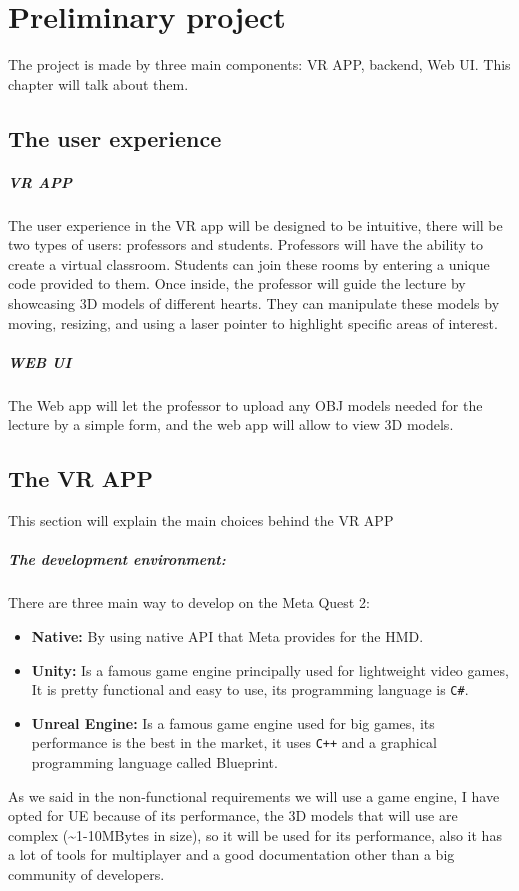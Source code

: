 
\chapter{Preliminary project}
\noindent
The project is made by three main components: \ac{VR} APP, backend, Web \ac{UI}. This chapter will talk about them.
\section{The user experience}
\paragraph{VR APP}
The user experience in the \ac{VR} app will be designed to be intuitive, there will be two types of users: professors and students.
Professors will have the ability to create a virtual classroom. Students can join these rooms by entering a unique code provided to them. Once inside, the professor will guide the lecture by showcasing 3D models of different hearts.
They can manipulate these models by moving, resizing, and using a laser pointer to highlight specific areas of interest. 
\paragraph{WEB UI}
The Web app will let the professor to upload any OBJ models needed for the lecture by a simple form, and the web app will allow to view 3D models.

\section{The VR APP}
\noindent
This section will explain the main choices behind the \ac{VR} APP
\paragraph{The development environment:} 
There are three main way to develop on the Meta Quest 2:

\begin{itemize}
  \item \textbf{Native:} By using native \ac{API} that Meta provides for the \ac{HMD}.
  \item \textbf{Unity:} Is a famous game engine principally used for lightweight video games, It is pretty functional and easy to use, its programming language is \texttt{C\#}. 
  \item \textbf{Unreal Engine:} Is a famous game engine used for big games, its performance is the best in the market, it uses \texttt{C++} and a graphical programming language called Blueprint.
\end{itemize}
\noindent
As we said in the non-functional requirements we will use a game engine, I have opted for \ac{UE} because of its performance, the 3D models that will use are complex (\textasciitilde1-10MBytes in size),
so it will be used for its performance, also it has a lot of tools for multiplayer and a good documentation other than a big community of developers.


